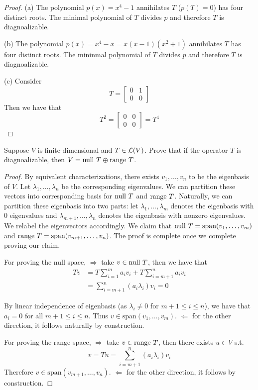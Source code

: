 \documentclass{extarticle}
\begin{document}
\begin{proof}
(a) The polynomial \(p(x) = x^4 - 1\) annihilates \(T\) (\(p(T) = 0\)) has four distinct roots. The minimal 
polynomial of \(T\) divides \(p\) and therefore \(T\) is diagnoalizable. 

(b) The polynomial \(p(x) = x^4 - x = x(x-1)(x^2 +1)\) annihilates \(T\) has four distinct roots. The mininmal 
polynomial of \(T\) divides \(p\) and therefore \(T\) is diagnoalizable. 

(c) Consider 
\[T = \begin{bmatrix}
    0 & 1 \\ 
    0 & 0
\end{bmatrix}\]
Then we have that 
\[T^2 = \begin{bmatrix}
    0 & 0 \\ 
    0 & 0
\end{bmatrix} =  T^4 \]
\end{proof}

\begin{problem}{3}
    Suppose \(V\) is finite-dimensional and \(T \in \mathcal{L}(V)\). Prove that if the operator \(T\) is 
    diagnoalizable, then \(V = \text{null } T \oplus \text{range } T\).
\end{problem}

\begin{proof}
By equivalent characterizations, there exists \(v_1, \ldots, v_n\) to be the eigenbasis of \(V\). Let 
\(\lambda_1, \ldots, \lambda_n\) be the corresponding eigenvalues. We can partition these vectors into corresponding 
basis for \(\text{null } T\) and \(\text{range } T\). Naturally, we can partition these eigenbasis into two parts: let 
\(\lambda_1, \ldots, \lambda_m\) denotes the eigenbasis with 0 eigenvalues and \(\lambda_{m+1}, \ldots, 
\lambda_n\) denotes the eigenbasis with nonzero eigenvalues. We relabel the eigenvectors accordingly. 
We claim that \(\text{null } T = \text{span}(v_1, 
\ldots, v_m)\) and \(\text{range } T = \text{span}(v_{m+1}, \ldots, v_n)\). The proof is complete once 
we complete proving our claim. 

For proving the null space, \(\Rightarrow\) take \(v \in \text{null } T\), then we have that 
\begin{align*}
    Tv 
    &= T \sum_{i=1}^{m}a_i v_i + T \sum_{i=m+1}^{n} a_i v_i \\ 
    &= \sum_{i=m+1}^{n} (a_i \lambda_i) v_i = 0 
\end{align*}

By linear independence of eigenbasis (as \(\lambda_i \neq 0 \) for \(m+1 \leq i \leq n\)), we have that 
\(a_i = 0\) for all \(m+1 \leq i \leq n\). Thus \(v \in \text{span}(v_1, \ldots, v_m)\). \(\Leftarrow\) 
for the other direction, it follows naturally by construction. 

For proving the range space, \(\Rightarrow\) take \(v \in \text{range } T\), then there exists \(u \in V\) 
s.t. 
\[v = Tu  = \sum_{i=m+1}^{n} (a_i \lambda_i)v_i\]
Therefore \(v \in \text{span}(v_{m+1}, \ldots, v_n)\). \(\Leftarrow\) for the other direction, it follows 
by construction. 

\end{proof}
\end{document}
